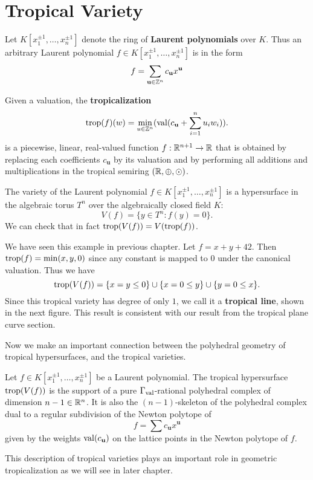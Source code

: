 \section{Tropical Variety}
\label{sec:tropical-variety}
	Let $K[x_1^{\pm1}, \ldots, x_n^{\pm1}]$ 
	denote the ring of \textbf{Laurent polynomials} over $K$.
	Thus an arbitrary 
	Laurent polynomial $f \in K[x_1^{\pm1}, \ldots, x_n^{\pm1}]$ is 
	in the form 
	\[
	f = \sum\limits_{\mathbf{u} \in \mathbb{Z}^n} c_{\mathbf{u}}x^{\mathbf{u}}
	\]
	\begin{definition}
		Given a valuation,
		the \textbf{tropicalization} 
		\[
		\operatorname{trop}(f)(w) = \min\limits_{u \in \mathbb{Z}^n} (\operatorname{val}(c_\mathbf{u} + \sum\limits_{i = 1}^{n} u_i w_i)).
		\] 
		is a piecewise, linear, real-valued function
		$f: \mathbb{R}^{n+1} \rightarrow \mathbb{R}$ 
		that is obtained by replacing each coefficients $c_{\mathbf{u}}$ 
		by its valuation and 
		by performing all additions and multiplications 
		in the tropical semiring $(\mathbb{R}, \oplus, \odot)$.
	\end{definition}
	
	The variety of the Laurent polynomial $f \in K[x_1^{\pm 1}, \ldots, x_n^{\pm 1}]$ 
	is a hypersurface in the algebraic torus $T^n$ over the algebraically 
	closed field $K$:
	\[
	V(f) = \{ y \in T^n: f(y) = 0 \}.
	\]
	We can check that in fact $\operatorname{trop}(V(f)) = V(\operatorname{trop}(f))$.
	
	\begin{example}
		We have seen this example in previous chapter.
		Let $f =  x + y + 42$. 
		Then $\operatorname{trop}(f) = \min(x, y, 0)$ since any constant is mapped 
		to $0$ under the canonical valuation.
		Thus we have 
		\[
		\operatorname{trop}(V(f)) = \{x = y \le 0\} \cup \{x = 0 \le y\} \cup \{y = 0 \le x \}.
		\]
		Since this tropical variety has degree of only $1$,
		we call it a \textbf{tropical line}, 
		shown in the next figure. 
		This result is consistent with our result from the tropical 
		plane curve section.
	\end{example}
	
	Now we make an important connection between 
	the polyhedral geometry of tropical hypersurfaces,
	and the tropical varieties. 
	\begin{proposition}
		Let $f \in K[x_1^{\pm 1}, \ldots, x_n^{\pm 1}]$ 
		be a Laurent polynomial.
		The tropical hypersurface $\operatorname{trop}(V(f))$ is the support of
		a pure $\Gamma_{\operatorname{val}}$-rational polyhedral complex 
		of dimension $n - 1 \in \mathbb{R}^n$.
		It is also the $(n -1)$-skeleton of the polyhedral complex 
		dual to a regular subdivision of the Newton polytope of 
		\[
		f = \sum c_\mathbf{u} x^\mathbf{u}
		\]
		given by the weights $\operatorname{val}(c_\mathbf{u})$ on the lattice points
		in the Newton polytope of $f$. 
	\end{proposition}
	This description of tropical varieties plays an important role in geometric tropicalization as we will see in later chapter. 
